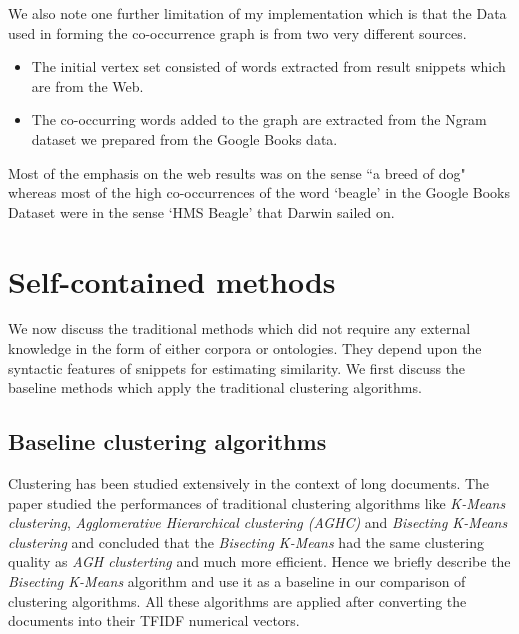 \documentclass[a4paper,12pt]{report}
\begin{document}
We also note one further limitation of my implementation which is that
the Data used in forming the co-occurrence graph is from two very
different sources.
\begin{itemize}
\item The initial vertex set consisted of words extracted from result snippets
which are from the Web.
\item The co-occurring words added to the graph are extracted from the Ngram
dataset we prepared from the Google Books data. 
\end{itemize}
Most of the emphasis on the web results was on the sense ``a breed of dog"
whereas most of the high co-occurrences of the word `beagle' in the Google
Books Dataset were in the sense `HMS Beagle' that Darwin sailed on.

\section{Self-contained methods}

We now discuss the traditional methods which did not require any
external knowledge in the form of either corpora or ontologies. They
depend upon the syntactic features of snippets for estimating
similarity. We first discuss the baseline methods which apply the
traditional clustering algorithms.

\subsection{Baseline clustering algorithms}

Clustering has been studied extensively in the context of long
documents. The paper \cite{clusteringCompare} studied the performances
of traditional clustering algorithms like {\it K-Means clustering},
{\it Agglomerative Hierarchical clustering (AGHC)} and {\it Bisecting K-Means
  clustering} and concluded that the {\it Bisecting K-Means} had the
same clustering quality as {\it AGH clusterting} and much more
efficient. Hence we briefly describe the {\it Bisecting K-Means}
algorithm and use it as a baseline in our comparison of clustering
algorithms. All these algorithms are applied after converting the
documents into their TFIDF numerical vectors.
\end{document}
